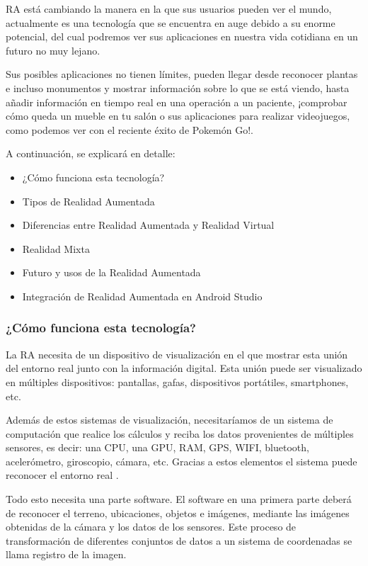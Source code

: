 RA está cambiando la manera en la que sus usuarios pueden ver el mundo, actualmente es una tecnología que se encuentra en auge debido a su enorme potencial, del cual podremos ver sus aplicaciones en nuestra vida cotidiana en un futuro no muy lejano. 

Sus posibles aplicaciones no tienen límites, pueden llegar desde reconocer plantas e incluso monumentos y mostrar información sobre lo que se está viendo, hasta añadir información en tiempo real en una operación a un paciente, ¡comprobar cómo queda un mueble en tu salón o sus aplicaciones para realizar videojuegos, como podemos ver con el reciente éxito de Pokemón Go!. 

A continuación, se explicará en detalle:
\begin{itemize}
\item ¿Cómo funciona esta tecnología?
\item Tipos de Realidad Aumentada
\item Diferencias entre Realidad Aumentada y Realidad Virtual
\item Realidad Mixta
\item Futuro y usos de la Realidad Aumentada
\item Integración de Realidad Aumentada en Android Studio
\end{itemize}  

\subsubsection{¿Cómo funciona esta tecnología?}
La RA necesita de un dispositivo de visualización en el que mostrar esta unión del entorno real junto con la información digital. Esta unión puede ser visualizado en múltiples dispositivos: pantallas, gafas, dispositivos portátiles, smartphones, etc.
 
Además de estos sistemas de visualización, necesitaríamos de un sistema de computación que realice los cálculos y reciba los datos provenientes de múltiples sensores, es decir: una CPU, una GPU, RAM, GPS, WIFI, bluetooth, acelerómetro, giroscopio, cámara, etc. Gracias a estos elementos el sistema puede reconocer el entorno real  \cite{URL::ImageRegister}.

Todo esto necesita una parte software. El software en una primera parte deberá de reconocer el terreno, ubicaciones, objetos e imágenes, mediante las imágenes obtenidas de la cámara y los datos de los sensores. Este proceso de transformación de diferentes conjuntos de datos a un sistema de coordenadas se llama registro de la imagen. 

